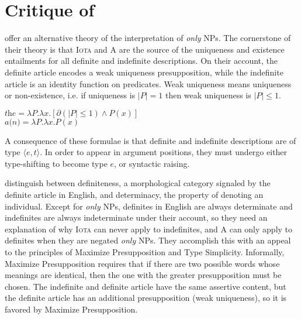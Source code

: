 \section{Critique of \citet{cb2015}\label{sec:coppock-beaver}}
\citet{cb2015} offer an alternative theory of the interpretation of \textit{only} NPs. The cornerstone of their theory is that \textsc{Iota} and \textsc{A} are the source of the uniqueness and existence entailments for all definite and indefinite descriptions. On their account, the definite article encodes a weak uniqueness presupposition, while the indefinite article is an identity function on predicates. Weak uniqueness means uniqueness or non-existence, i.e. if uniqueness is $|P| = 1$ then weak uniqueness is $|P| \le 1$.

\begin{exe}
	\ex $\textit{the} = \lambda P . \lambda x . [\partial(|P| \le 1) \land P(x)]$ \\
	\hspace*{\fill} \citep[p. 395]{cb2015}  %
	\ex $\textit{a(n)} = \lambda P . \lambda x . P(x)$ \\
	\hspace*{\fill} \citep[p. 401]{cb2015}  %
\end{exe}

A consequence of these formulae is that definite and indefinite descriptions are of type $\langle e, t \rangle$. In order to appear in argument positions, they must undergo either type-shifting to become type $e$, or syntactic raising.

\citeauthor{cb2015} distinguish between definiteness, a morphological category signaled by the definite article in English, and determinacy, the property of denoting an individual. Except for \textit{only} NPs, definites in English are always determinate and indefinites are always indeterminate under their account, so they need an explanation of why \textsc{Iota} can never apply to indefinites, and \textsc{A} can only apply to definites when they are negated \textit{only} NPs. They accomplish this with an appeal to the principles of Maximize Presupposition and Type Simplicity. Informally, Maximize Presupposition requires that if there are two possible words whose meanings are identical, then the one with the greater presupposition must be chosen. The indefinite and definite article have the same assertive content, but the definite article has an additional presupposition (weak uniqueness), so it is favored by Maximize Presupposition.


